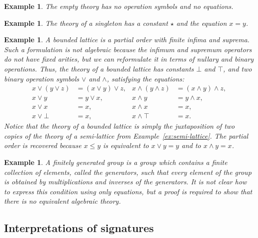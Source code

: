 \documentclass{amsart}
\newtheorem{example}[definition]{Example}
\begin{document}
\begin{example}
  \label{ex:theory-empty}
  The \emph{empty theory} has no operation symbols and no equations.
\end{example}

\begin{example}
  \label{ex:theory-singleton}
  The theory of a \emph{singleton} has a constant $\star$ and the equation $x = y$.
\end{example}

\begin{example}
  \label{ex:lattice}
  A bounded lattice is a partial order with finite infima and suprema. Such a formulation
  is not algebraic because the infimum and supremum operators do not have fixed arities,
  but we can reformulate it in terms of nullary and binary operations.
  Thus, the theory of a bounded lattice has constants $\bot$ and $\top$, and two binary
  operation symbols $\vee$ and $\wedge$, satisfying the equations:
  \begin{align*}
    x \vee (y \vee z) &= (x \vee y) \vee z,   &      x \wedge (y \wedge z) &= (x \wedge y) \wedge z,\\
    x \vee y &= y \vee x,                     &      x \wedge y &= y \wedge x,\\
    x \vee x &= x,                            &      x \wedge x &= x,\\
    x \vee \bot &= x,                         &      x \wedge \top &= x.
  \end{align*}
  Notice that the theory of a bounded lattice is simply the juxtaposition of two copies of
  the theory of a semi-lattice from Example~\ref{ex:semi-lattice}. The partial order is
  recovered because $x \leq y$ is equivalent to $x \vee y = y$ and to $x \wedge y = x$.
\end{example}

\begin{example}
  \label{ex:finitely-generated-group}
  A \emph{finitely generated group} is a group which contains a finite collection of
  elements, called the \emph{generators}, such that every element of the group is obtained
  by multiplications and inverses of the generators. It is not clear how to express this
  condition using only equations, but a proof is required to show that there is no
  equivalent algebraic theory.
\end{example}


\subsection{Interpretations of signatures}
\label{sec:interp-of-sign}
\end{document}
